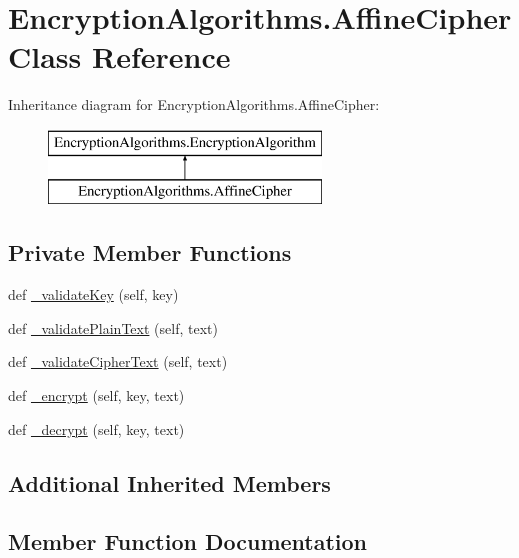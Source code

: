 \hypertarget{classEncryptionAlgorithms_1_1AffineCipher}{}\section{Encryption\+Algorithms.\+Affine\+Cipher Class Reference}
\label{classEncryptionAlgorithms_1_1AffineCipher}
Inheritance diagram for Encryption\+Algorithms.\+Affine\+Cipher\+:\begin{figure}[H]
\begin{center}
\leavevmode
\includegraphics[height=2.000000cm]{classEncryptionAlgorithms_1_1AffineCipher}
\end{center}
\end{figure}
\subsection*{Private Member Functions}
\begin{DoxyCompactItemize}
\item 
def \mbox{\hyperlink{classEncryptionAlgorithms_1_1AffineCipher_afe69f083dfa42c02810e29f80ca04947}{\+\_\+validate\+Key}} (self, key)
\item 
def \mbox{\hyperlink{classEncryptionAlgorithms_1_1AffineCipher_a2904acea89ffc703205906fbb935393d}{\+\_\+validate\+Plain\+Text}} (self, text)
\item 
def \mbox{\hyperlink{classEncryptionAlgorithms_1_1AffineCipher_a6d8229ee69ea1d543f44ac01b16f7413}{\+\_\+validate\+Cipher\+Text}} (self, text)
\item 
def \mbox{\hyperlink{classEncryptionAlgorithms_1_1AffineCipher_ab526a5a15a9d1d616ccb49ff12a37d14}{\+\_\+encrypt}} (self, key, text)
\item 
def \mbox{\hyperlink{classEncryptionAlgorithms_1_1AffineCipher_af29603acbf0ce85d618c8e50ef040604}{\+\_\+decrypt}} (self, key, text)
\end{DoxyCompactItemize}
\subsection*{Additional Inherited Members}


\subsection{Member Function Documentation}
\mbox{\label{classEncryptionAlgorithms_1_1AffineCipher_af29603acbf0ce85d618c8e50ef040604}} 
